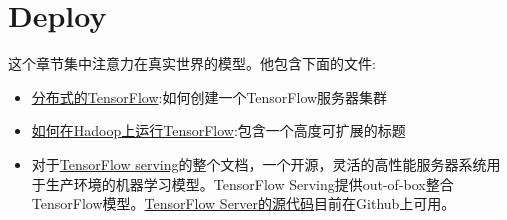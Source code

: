 \chapter{Deploy}
这个章节集中注意力在真实世界的模型。他包含下面的文件:
\begin{itemize}
\item \href{https://www.tensorflow.org/deploy/distributed?hl=zh-cn}{分布式的TensorFlow}:如何创建一个TensorFlow服务器集群
\item \href{https://www.tensorflow.org/deploy/hadoop?hl=zh-cn}{如何在Hadoop上运行TensorFlow}:包含一个高度可扩展的标题
\item 对于\href{https://www.tensorflow.org/serving?hl=zh-cn}{TensorFlow serving}的整个文档，一个开源，灵活的高性能服务器系统用于生产环境的机器学习模型。TensorFlow Serving提供out-of-box整合TensorFlow模型。\href{https://github.com/tensorflow/serving}{TensorFlow Server的源代码}目前在Github上可用。
\end{itemize}
